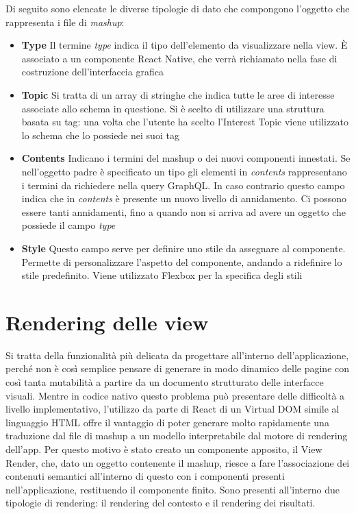 Di seguito sono elencate le diverse tipologie di dato che compongono l'oggetto che rappresenta i file di \emph{mashup}:
\begin{itemize}
	\item \textbf{Type} Il termine \emph{type} indica il tipo dell'elemento da visualizzare nella view. È associato a un componente React Native, che verrà richiamato nella fase di costruzione dell'interfaccia grafica
	\item \textbf{Topic} Si tratta di un array di stringhe che indica tutte le aree di interesse associate allo schema in questione. Si è scelto di utilizzare una struttura basata su tag: una volta che l’utente ha scelto l’Interest Topic viene utilizzato lo schema che lo possiede nei suoi tag 
	\item \textbf{Contents} Indicano i termini del mashup o dei nuovi componenti innestati. Se nell'oggetto padre è specificato un tipo gli elementi in \emph{contents} rappresentano i termini da richiedere nella query GraphQL. In caso contrario questo campo indica che in \emph{contents} è presente un nuovo livello di annidamento. Ci possono essere tanti annidamenti, fino a quando non si arriva ad avere un oggetto che possiede il campo \emph{type}
	\item \textbf{Style} Questo campo serve per definire uno stile da assegnare al componente. Permette di personalizzare l’aspetto del componente, andando a ridefinire lo stile predefinito. Viene utilizzato Flexbox per la specifica degli stili
\end{itemize}

\section{Rendering delle view}\label{sec:rendering-view}

Si tratta della funzionalità più delicata da progettare all'interno dell'applicazione, perché non è così semplice pensare di generare in modo dinamico delle pagine con così tanta mutabilità a partire da un documento strutturato delle interfacce visuali.
Mentre in codice nativo questo problema può presentare delle difficoltà a livello implementativo, l'utilizzo da parte di React di un Virtual DOM simile al linguaggio HTML offre il vantaggio di poter generare molto rapidamente una traduzione dal file di mashup a un modello interpretabile dal motore di rendering dell'app.
Per questo motivo è stato creato un componente apposito, il View Render, che, dato un oggetto contenente il mashup, riesce a fare l'associazione dei contenuti semantici all'interno di questo con i componenti presenti nell'applicazione, restituendo il componente finito.
Sono presenti all'interno due tipologie di rendering: il rendering del contesto e il rendering dei risultati.

